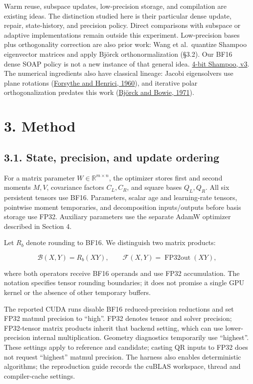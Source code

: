 \documentclass[
  10pt,
]{article}
\begin{document}
Warm reuse, subspace updates, low-precision storage, and compilation are
existing ideas. The distinction studied here is their particular dense
update, repair, state-history, and precision policy. Direct comparisons
with subspace or adaptive implementations remain outside this
experiment. Low-precision bases plus orthogonality correction are also
prior work: Wang et al.~quantize Shampoo eigenvector matrices and apply
Björck orthonormalization (§3.2). Our BF16 dense SOAP policy is not a
new instance of that general idea.
\href{https://arxiv.org/html/2405.18144v3}{4-bit Shampoo, v3}. The
numerical ingredients also have classical lineage: Jacobi eigensolvers
use plane rotations (\href{https://doi.org/10.2307/1993275}{Forsythe and
Henrici, 1960}), and iterative polar orthogonalization predates this
work (\href{https://doi.org/10.1137/0708036}{Björck and Bowie, 1971}).

\hypertarget{method}{%
\section{3. Method}\label{method}}

\hypertarget{state-precision-and-update-ordering}{%
\subsection{3.1. State, precision, and update
ordering}\label{state-precision-and-update-ordering}}

For a matrix parameter \(W\in\mathbb{R}^{m\times n}\), the optimizer
stores first and second moments \(M,V\), covariance factors \(C_L,C_R\),
and square bases \(Q_L,Q_R\). All six persistent tensors use BF16.
Parameters, scalar age and learning-rate tensors, pointwise moment
temporaries, and decomposition inputs/outputs before basis storage use
FP32. Auxiliary parameters use the separate AdamW optimizer described in
Section 4.

Let \(R_b\) denote rounding to BF16. We distinguish two matrix products:

\[
\mathcal B(X,Y)=R_b(XY),\qquad
\mathcal F(X,Y)=\operatorname{FP32out}(XY),
\]

where both operators receive BF16 operands and use FP32 accumulation.
The notation specifies tensor rounding boundaries; it does not promise a
single GPU kernel or the absence of other temporary buffers.

The reported CUDA runs disable BF16 reduced-precision reductions and set
FP32 matmul precision to ``high''. FP32 denotes tensor and solver
precision; FP32-tensor matrix products inherit that backend setting,
which can use lower-precision internal multiplication. Geometry
diagnostics temporarily use ``highest''. These settings apply to
reference and candidate; casting QR inputs to FP32 does not request
``highest'' matmul precision. The harness also enables deterministic
algorithms; the reproduction guide records the cuBLAS workspace, thread
and compiler-cache settings.
\end{document}
